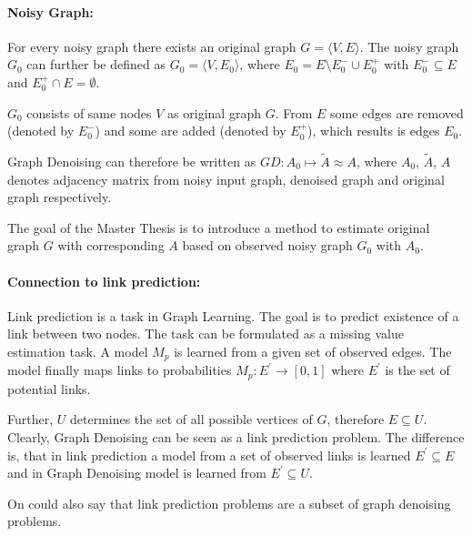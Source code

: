 \paragraph{Noisy Graph:}
For every noisy graph there exists an original graph $G = \langle V,E \rangle$.
The noisy graph $G_0$ can further be defined as $G_0 = \langle V, E_0 \rangle$,  
 where $E_0 = E \setminus  E^{-}_0 \cup  E^{+}_0$ with $E^{-}_0 \subseteq E$ and $E^{+}_0 \cap E = \emptyset$.

$G_0$ consists of same nodes $V$ as original graph $G$. 
From $E$ some edges are removed (denoted by $E^{-}_0$) and some are added
(denoted by $E^{+}_0$), which results is edges $E_0$.

Graph Denoising can therefore be written as $GD: A_0 \mapsto \tilde{A} \approx A$,
where $A_0$, $\tilde{A}$, $A$ denotes adjacency matrix from noisy input graph, denoised graph and original graph respectively.

 \begin{tcolorbox}[colback=red!5!white,colframe=red!75!black]
    The goal of the Master Thesis is to introduce a method to estimate 
    original graph $G$ with corresponding $A$ based on observed noisy graph $G_0$ with $A_0$.
\end{tcolorbox}

\paragraph{Connection to link prediction:}
Link prediction is a task in Graph Learning. 
The goal is to predict existence of a link between two nodes.
The task can be formulated as a missing value estimation task. A model $M_p$ is learned
from a given set of observed edges. The model finally maps links to probabilities
$M_p : E^{\prime} \rightarrow [0,1]$ where $E^{\prime}$ is the set of potential links.

Further, $U$ determines the set of all possible vertices of $G$, therefore $E \subseteq U$.
Clearly, Graph Denoising can be seen as a link prediction problem.
The difference is, that in link prediction a model from a set of observed links is learned
$E^{\prime}  \subseteq E$ and in Graph Denoising model is learned from 
$E^{\prime}  \subseteq U$. 

\begin{tcolorbox}[colback=red!5!white,colframe=red!75!black]
    On could also say that link prediction problems are a subset of graph denoising problems.
\end{tcolorbox}


